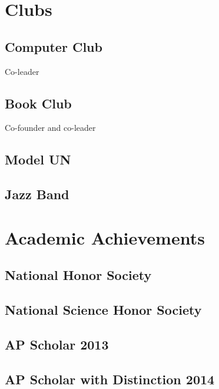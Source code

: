 \documentclass{article}
\begin{document}
\section{Clubs}
\subsection{Computer Club}
Co-leader
\subsection{Book Club}
Co-founder and co-leader
\subsection{Model UN}
\subsection{Jazz Band}
\section{Academic Achievements}
\subsection{National Honor Society}
\subsection{National Science Honor Society}
\subsection{AP Scholar 2013}
\subsection{AP Scholar with Distinction 2014}
\end{document}
